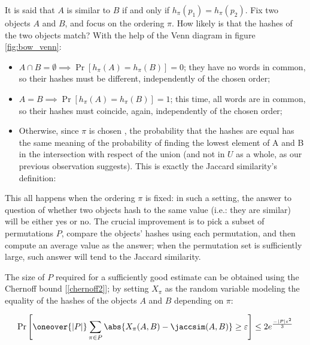 It is said that $A$ is similar to $B$ if and only if $h_\pi(p_1) = h_\pi(p_2)$. Fix two objects $A$ and $B$, and focus on the ordering $\pi$. How likely is that the hashes of the two objects match? With the help of the Venn diagram in figure \ref{fig:bow_venn}:

\begin{itemize}
    \item $A \cap B = \emptyset \implies \Pr[h_\pi(A) = h_\pi(B)] = 0$; they have no words in common, so their hashes must be different, independently of the chosen order;
    \item $A = B \implies \Pr[h_\pi(A) = h_\pi(B)] = 1$; this time, all words are in common, so their hashes must coincide, again, independently of the chosen order;
    \item Otherwise, since $\pi$ is chosen \uar, the probability that the hashes are equal has the same meaning of the probability of finding the lowest element of A and B in the intersection with respect of the union (and not in $U$ as a whole, as our previous observation suggests). This is exactly the Jaccard similarity's definition:
\end{itemize}

This all happens when the ordering $\pi$ is fixed: in such a setting, the answer to question of whether two objects hash to the same value (i.e.: they are similar) will be either yes or no. The crucial improvement is to pick a subset of permutations $P$, compare the objects' hashes using each permutation, and then compute an average value as the answer; when the permutation set is sufficiently large, such answer will tend to the Jaccard similarity.

The size of $P$ required for a sufficiently good estimate can be obtained using the Chernoff bound [\ref{chernoff2}]; by setting $X_\pi$ as the random variable modeling the equality of the hashes of the objects $A$ and $B$ depending on $\pi$:

\begin{equation} \label{eq:lsh-chernoff}
    \Pr \left[ \oneover{|P|} \sum_{\pi \in P} \abs{X_\pi(A, B) - \jaccsim(A, B)} \geq \varepsilon \right] \leq 2e^{\frac{-|P| \varepsilon^2}{3}}
\end{equation}

